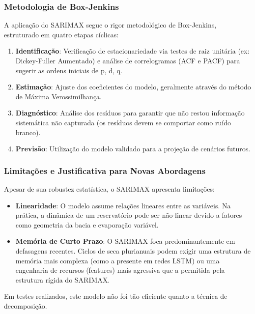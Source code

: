 \subsubsection{Metodologia de Box-Jenkins}

A aplicação do \acrshort{SARIMAX} segue o rigor metodológico de Box-Jenkins, estruturado em quatro etapas cíclicas: 

\begin{enumerate}
\item \textbf{Identificação}: Verificação de estacionariedade via testes de raiz unitária (ex: Dickey-Fuller Aumentado) e análise de correlogramas (\acrfull{ACF} e \acrfull{PACF}) para sugerir as ordens iniciais de p, d, q. 
\item \textbf{Estimação}: Ajuste dos coeficientes do modelo, geralmente através do método de Máxima Verossimilhança. 
\item \textbf{Diagnóstico}: Análise dos resíduos para garantir que não restou informação sistemática não capturada (os resíduos devem se comportar como ruído branco). 
\item \textbf{Previsão}: Utilização do modelo validado para a projeção de cenários futuros.
\end{enumerate}

\subsubsection{Limitações e Justificativa para Novas Abordagens}

Apesar de sua robustez estatística, o \acrshort{SARIMAX} apresenta limitações: 

\begin{itemize}
\item \textbf{Linearidade}: O modelo assume relações lineares entre as variáveis. Na prática, a dinâmica de um reservatório pode ser não-linear devido a fatores como geometria da bacia e evaporação variável. 
\item \textbf{Memória de Curto Prazo}: O \acrshort{SARIMAX} foca predominantemente em defasagens recentes. Ciclos de seca plurianuais podem exigir uma estrutura de memória mais complexa (como a presente em redes \acrshort{LSTM}) ou uma engenharia de recursos (features) mais agressiva que a permitida pela estrutura rígida do \acrshort{SARIMAX}.
\end{itemize}

Em testes realizados, este modelo não foi tão eficiente quanto a técnica de decomposição. 

